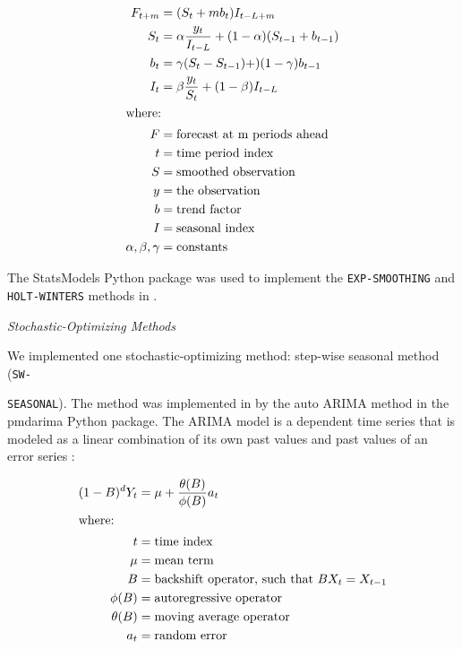 \begin{align}
    F_{t+m} &= (S_t +mb_t)I_{t-L+m} \\
    S_t &= \alpha \frac{y_t}{I_{t-L}}+(1-\alpha)(S_{t-1}+b_{t-1}) \nonumber \\
    b_t &= \gamma(S_t-S_{t-1})+)(1-\gamma)b_{t-1} \nonumber \\
    I_t &= \beta \frac{y_t}{S_t} + (1-\beta)I_{t-L} \nonumber \\
    \intertext{where:}
    F &= \mbox{forecast at m periods ahead} \nonumber \\
    t &= \mbox{time period index} \nonumber \\
    S &= \mbox{smoothed observation} \nonumber \\
    y &= \mbox{the observation} \nonumber \\
    b &= \mbox{trend factor} \nonumber \\
    I &= \mbox{seasonal index} \nonumber \\
    \alpha, \beta, \gamma &= \mbox{constants} \nonumber
\end{align}

The StatsModels \cite{seabold_statsmodels:_2010}
Python package was used to implement the \texttt{EXP-SMOOTHING} 
and \texttt{HOLT-WINTERS} methods in \deploy. 

\noindent
\textit{Stochastic-Optimizing Methods}

We implemented one stochastic-optimizing method: step-wise 
seasonal method (\texttt{SW-}

\noindent
\texttt{SEASONAL}). 
The method was implemented in \deploy by the auto \gls{ARIMA} 
method in the pmdarima \cite{smith_pmdarima:_2017}
Python package. 
The \gls{ARIMA} model is a dependent time series that is 
modeled as a linear combination of its own past values 
and past values of an error series \cite{institute_sas_1985}: 

\begin{align}
    (1-B)^dY_t &= \mu + \frac{\theta(B)}{\phi(B)}a_t \\ 
    \intertext{where:}
    t &= \mbox{time index} \nonumber \\
    \mu &= \mbox{mean term} \nonumber \\
    B &= \mbox{backshift operator, such that } BX_t = X_{t-1} \nonumber \\
    \phi(B) &= \mbox{autoregressive operator} \nonumber \\
    \theta(B) &= \mbox{moving average operator} \nonumber \\
    a_t &= \mbox{random error} \nonumber 
\end{align}

